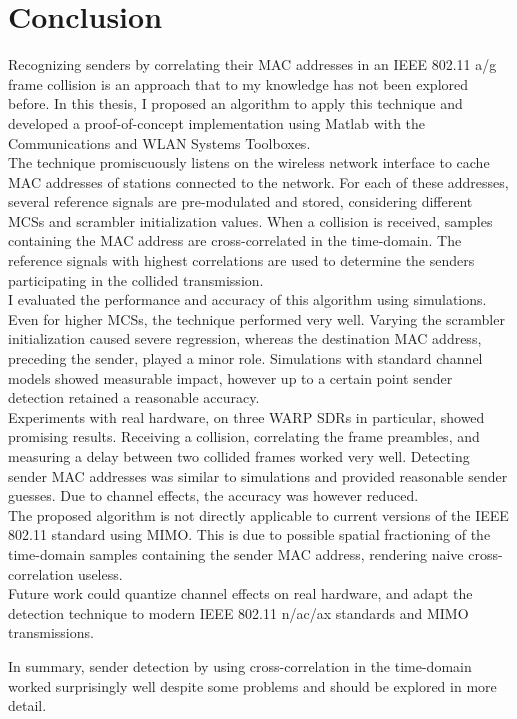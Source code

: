 
\chapter{Conclusion}\label{ch:Conclusion}
\glsresetall %

Recognizing senders by correlating their \gls{MAC} addresses in an IEEE 802.11 a/g frame collision is an approach that to my knowledge has not been explored before. In this thesis, I proposed an algorithm to apply this technique and developed a proof-of-concept implementation using Matlab with the Communications and WLAN Systems Toolboxes.\\

The technique promiscuously listens on the wireless network interface to cache \gls{MAC} addresses of stations connected to the network. For each of these addresses, several reference signals are pre-modulated and stored, considering different \glspl{MCS} and scrambler initialization values. When a collision is received, samples containing the \gls{MAC} address are cross-correlated in the time-domain. The reference signals with highest correlations are used to determine the senders participating in the collided transmission.\\

I evaluated the performance and accuracy of this algorithm using simulations. Even for higher \glspl{MCS}, the technique performed very well. Varying the scrambler initialization caused severe regression, whereas the destination \gls{MAC} address, preceding the sender, played a minor role. Simulations with standard channel models showed measurable impact, however up to a certain point sender detection retained a reasonable accuracy.\\

Experiments with real hardware, on three \gls{WARP} \glspl{SDR} in particular, showed promising results. Receiving a collision, correlating the frame preambles, and measuring a delay between two collided frames worked very well. Detecting sender \gls{MAC} addresses was similar to simulations and provided reasonable sender guesses. Due to channel effects, the accuracy was however reduced.\\

The proposed algorithm is not directly applicable to current versions of the IEEE 802.11 standard using \gls{MIMO}. This is due to possible spatial fractioning of the time-domain samples containing the sender \gls{MAC} address, rendering naive cross-correlation useless.\\

Future work could quantize channel effects on real hardware, and adapt the detection technique to modern IEEE 802.11 n/ac/ax standards and \gls{MIMO} transmissions.

In summary, sender detection by using cross-correlation in the time-domain worked surprisingly well despite some problems and should be explored in more detail.
